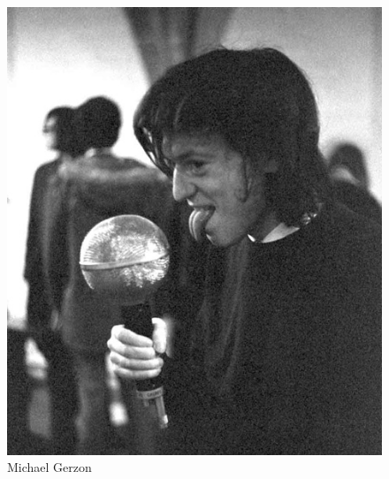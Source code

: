 \begin{figure}[hb]
\centering
\includegraphics[width=0.99\columnwidth]{CAPITOLI/1000/IMG/MAG-licking-G-web.jpg}
\caption[]{Michael Gerzon}
\label{ph:mg1}
\end{figure}
